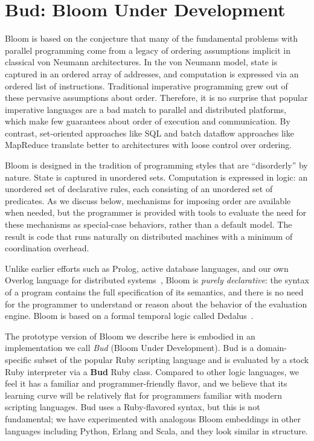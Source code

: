 \section{Bud: Bloom Under Development}
\label{sec:lang}
Bloom is based on the conjecture that many of the fundamental problems with
parallel programming come from a legacy of ordering assumptions implicit in classical von
Neumann architectures.  In the von Neumann model, state is captured in an
ordered array of addresses, and computation is expressed via an ordered list of
instructions.  Traditional imperative programming grew out of these pervasive
assumptions about order.  Therefore, it is no surprise that popular imperative
languages are a bad match to parallel and distributed platforms, which make few
guarantees about order of execution and communication. By contrast, set-oriented
approaches like SQL and batch dataflow approaches like MapReduce translate
better to architectures with loose control over ordering.

Bloom is designed in the tradition of programming styles that are ``disorderly''
by nature.  State is captured in unordered sets.  Computation is expressed
in logic: an unordered set of declarative rules, each consisting of an unordered
set of predicates.  As we discuss below, mechanisms for imposing order are
available when needed, but the programmer is provided with tools to evaluate the
need for these mechanisms as special-case behaviors, rather than a default
model.  The result is code that runs naturally on distributed machines with a
minimum of coordination overhead.
 
Unlike earlier efforts such as Prolog, active database languages, and our own
Overlog language for distributed systems~\cite{p2}, Bloom is {\em purely
  declarative}: the syntax of a program contains the full specification of its
semantics, and there is no need for the programmer to understand or reason about
the behavior of the evaluation engine.  Bloom is based on a formal temporal
logic called Dedalus~\cite{dedalus}.

The prototype version of Bloom we describe here is embodied in an implementation
we call {\em Bud} (Bloom Under Development).  Bud is a domain-specific subset of
the popular Ruby scripting language and is evaluated by a stock Ruby interpreter
via a \textbf{Bud} Ruby class.  Compared to other logic languages, we feel it
has a familiar and programmer-friendly flavor, and we believe that its learning
curve will be relatively flat for programmers familiar with modern scripting
languages.  Bud uses a Ruby-flavored syntax, but this is not fundamental; we
have experimented with analogous Bloom embeddings in other languages including
Python, Erlang and Scala, and they look similar in structure.

